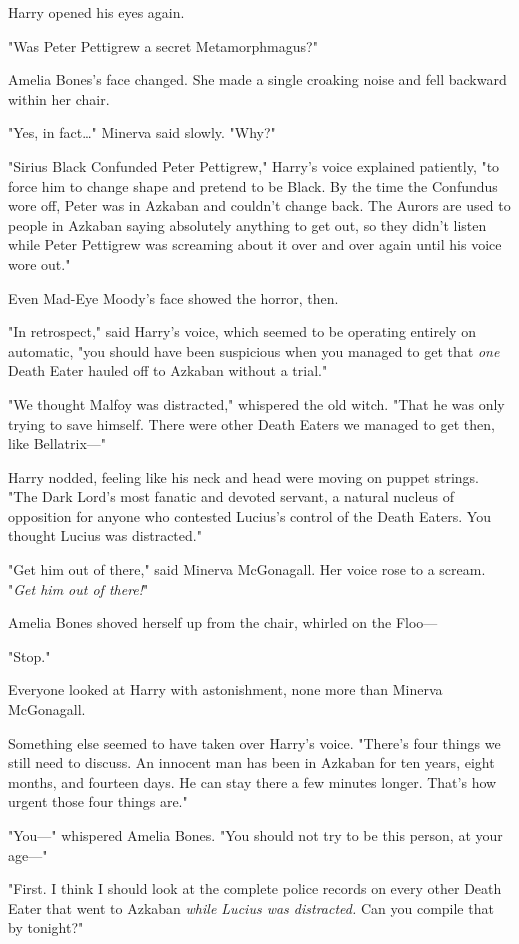 Harry opened his eyes again.

"Was Peter Pettigrew a secret Metamorphmagus?"

Amelia Bones's face changed. She made a single croaking noise and fell backward
within her chair.

"Yes, in fact{\ldots}" Minerva said slowly. "Why?"

"Sirius Black Confunded Peter Pettigrew," Harry's voice explained patiently,
"to force him to change shape and pretend to be Black. By the time the
Confundus wore off, Peter was in Azkaban and couldn't change back. The Aurors
are used to people in Azkaban saying absolutely anything to get out, so they
didn't listen while Peter Pettigrew was screaming about it over and over again
until his voice wore out."

Even Mad-Eye Moody's face showed the horror, then.

"In retrospect," said Harry's voice, which seemed to be operating entirely on
automatic, "you should have been suspicious when you managed to get that
\emph{one} Death Eater hauled off to Azkaban without a trial."

"We thought Malfoy was distracted," whispered the old witch. "That he was only
trying to save himself. There were other Death Eaters we managed to get then,
like Bellatrix---"

Harry nodded, feeling like his neck and head were moving on puppet strings.
"The Dark Lord's most fanatic and devoted servant, a natural nucleus of
opposition for anyone who contested Lucius's control of the Death Eaters. You
thought Lucius was distracted."

"Get him out of there," said Minerva McGonagall. Her voice rose to a scream.
"\emph{Get him out of there!}"

Amelia Bones shoved herself up from the chair, whirled on the Floo---

"Stop."

Everyone looked at Harry with astonishment, none more than Minerva McGonagall.

Something else seemed to have taken over Harry's voice. "There's four things we
still need to discuss. An innocent man has been in Azkaban for ten years, eight
months, and fourteen days. He can stay there a few minutes longer. That's how
urgent those four things are."

"You---" whispered Amelia Bones. "You should not try to be this person, at your
age---"

"First. I think I should look at the complete police records on every other
Death Eater that went to Azkaban \emph{while Lucius was distracted.} Can you
compile that by tonight?"

